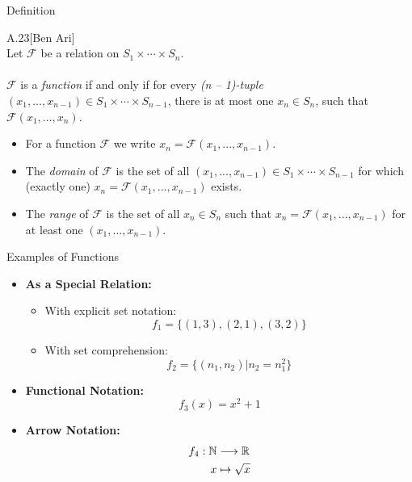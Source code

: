 \begin{slide}[bm=,toc=]{Definition}
\begin{defn}{A.23}[Ben Ari]
~\\
Let $\mathcal{F}$ be a relation on $S_1 \times \cdots \times S_n$.
\\~\\
$\mathcal{F}$ is a \emph{function} if and only if for every \emph{(n -- 1)-tuple}
$(x_1,...,x_{n-1}) \in S_1 \times \cdots \times S_{n-1}$, there is at most
one $x_n \in S_n$, such that $\mathcal{F}(x_1,...,x_n)$.
\begin{itemize}
\item For a function $\mathcal{F}$ we write $x_n = \mathcal{F}(x_1,...,x_{n-1})$.
\item The \emph{domain} of $\mathcal{F}$ is the set of all
$(x_1,...,x_{n-1})\in S_1 \times \cdots \times S_{n-1}$ for which (exactly one)
$x_n = \mathcal{F}(x_1,...,x_{n-1})$ exists.
\item The \emph{range} of $\mathcal{F}$ is the set of all $x_n \in S_n$ such
that $x_n = \mathcal{F}(x_1,...,x_{n-1})$ for at least one $(x_1,...,x_{n-1})$. 
\end{itemize}
\end{defn}
\end{slide}
\begin{slide}[bm=,toc=]{Examples of Functions}
\begin{itemize}
\item \textbf{As a Special Relation:}
\begin{itemize}
\item With explicit set notation: \[f_1 = \{(1,3),(2,1),(3,2)\}\]
\vspace{-5mm}
\item With set comprehension: \[f_2 = \{(n_1,n_2)|n_2 = n_1^2\}\]
\end{itemize}
\item \textbf{Functional Notation:}
\vspace{-3mm}
\[
  f_3(x) = x^2 + 1
  \]
\vspace{-5mm}
\item \textbf{Arrow Notation:}
\vspace{-3mm}
\begin{align*}
f_4:\mathbb{N} &\longrightarrow \mathbb{R} \\
    x &\mapsto \sqrt{x}
\end{align*}
\end{itemize}

\end{slide}


